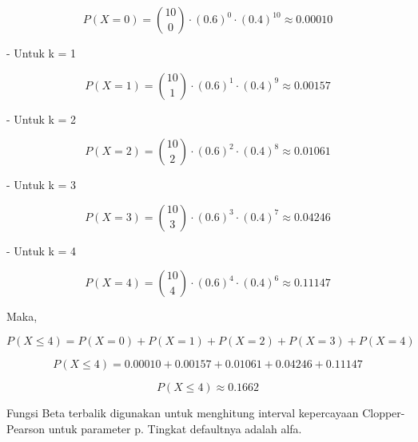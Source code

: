 \documentclass{article}
\begin{document}
\begin{eulernotebook}
\begin{eulercomment}
\begin{eulercomment}
\begin{eulerformula}
\[
P(X=0)= \binom{10}{0} \cdot (0.6)^{0} \cdot (0.4)^{10} \approx 0.00010
\]
\end{eulerformula}
\begin{eulercomment}
- Untuk k = 1\\
\end{eulercomment}
\begin{eulerformula}
\[
P(X = 1)= \binom{10}{1} \cdot (0.6)^{1} \cdot (0.4)^{9} \approx 0.00157
\]
\end{eulerformula}
\begin{eulercomment}
- Untuk k = 2\\
\end{eulercomment}
\begin{eulerformula}
\[
P(X = 2)= \binom{10}{2} \cdot (0.6)^{2} \cdot (0.4)^{8} \approx 0.01061
\]
\end{eulerformula}
\begin{eulercomment}
- Untuk k = 3\\
\end{eulercomment}
\begin{eulerformula}
\[
P(X = 3)= \binom{10}{3} \cdot (0.6)^{3} \cdot (0.4)^{7} \approx 0.04246
\]
\end{eulerformula}
\begin{eulercomment}
- Untuk k = 4\\
\end{eulercomment}
\begin{eulerformula}
\[
P(X = 4)= \binom{10}{4} \cdot (0.6)^{4} \cdot (0.4)^{6} \approx 0.11147
\]
\end{eulerformula}
\begin{eulercomment}
Maka,\\
\end{eulercomment}
\begin{eulerformula}
\[
P(X \leq 4)= P(X=0)+P(X=1)+P(X=2)+P(X=3)+P(X=4)
\]
\end{eulerformula}
\begin{eulerformula}
\[
P(X \leq 4)= 0.00010 + 0.00157 + 0.01061+ 0.04246+ 0.11147
\]
\end{eulerformula}
\begin{eulerformula}
\[
P(X \leq 4)\approx 0.1662
\]
\end{eulerformula}
\begin{eulercomment}
Fungsi Beta terbalik digunakan untuk menghitung interval kepercayaan
Clopper-Pearson untuk parameter p. Tingkat defaultnya adalah alfa.


\end{eulercomment}
\end{eulercomment}
\end{eulercomment}
\end{eulernotebook}
\end{document}
